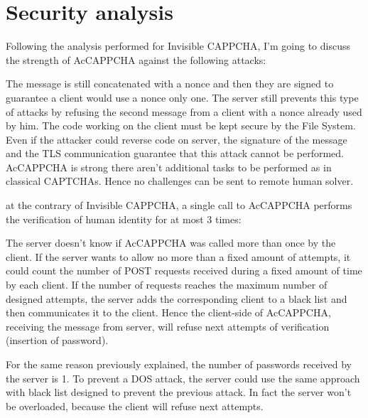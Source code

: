 \section{Security analysis}
Following the analysis performed for Invisible CAPPCHA\cite{Invisible_CAPPCHA}, I'm going to discuss the strength of AcCAPPCHA against the following attacks:
\begin{itemize}
{The message is still concatenated with a nonce and then they are signed to guarantee a client would use a nonce only one. The server still prevents this type of attacks by refusing the second message from a client with a nonce already used by him.}
{The code working on the client must be kept secure by the File System. Even if the attacker could reverse code on server, the signature of the message and the TLS communication guarantee that this attack cannot be performed.}
{AcCAPPCHA is strong there aren't additional tasks to be performed as in classical CAPTCHAs. Hence no challenges can be sent to remote human solver.}
{at the contrary of Invisible CAPPCHA, a single call to AcCAPPCHA performs the verification of human identity for at most 3 times:
\begin{itemize}
\end{itemize}
The server doesn't know if AcCAPPCHA was called more than once by the client. If the server wants to allow no more than a fixed amount of attempts, it could count the number of POST requests received during a fixed amount of time by each client. If the number of requests reaches the maximum number of designed attempts, the server adds the corresponding client to a black list and then communicates it to the client. Hence the client-side of AcCAPPCHA, receiving the message from server, will refuse next attempts of verification (insertion of password).
}
{For the same reason previously explained, the number of passwords received by the server is 1. To prevent a DOS attack, the server could use the same approach with black list designed to prevent the previous attack. In fact the server won't be overloaded, because the client will refuse next attempts.}
\end{itemize}